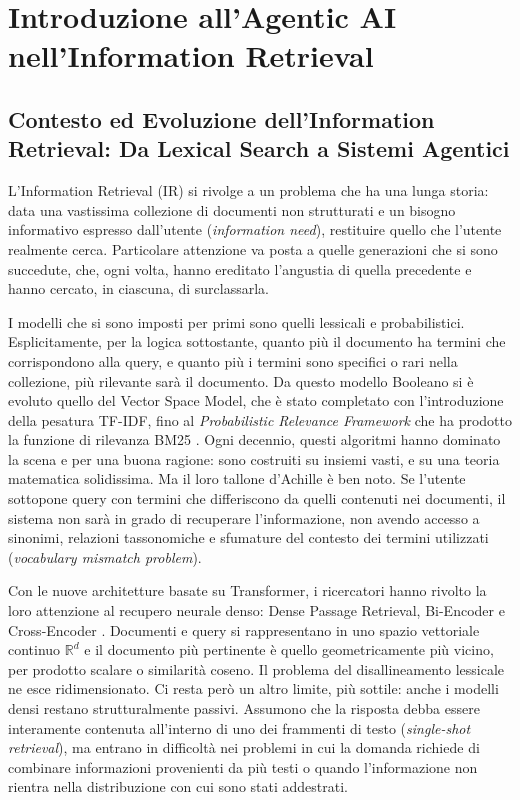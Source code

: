\chapter{Introduzione all'Agentic AI nell'Information Retrieval}
\label{chap:introduzione}

\section{Contesto ed Evoluzione dell'Information Retrieval: Da Lexical Search a Sistemi Agentici}
\label{sec:contesto_evoluzione}

L'Information Retrieval (IR) si rivolge a un problema che ha una lunga storia: data una vastissima collezione di documenti non strutturati e un bisogno informativo espresso dall'utente (\textit{information need}), restituire quello che l'utente realmente cerca. Particolare attenzione va posta a quelle generazioni che si sono succedute, che, ogni volta, hanno ereditato l'angustia di quella precedente e hanno cercato, in ciascuna, di surclassarla.

I modelli che si sono imposti per primi sono quelli lessicali e probabilistici. Esplicitamente, per la logica sottostante, quanto più il documento ha termini che corrispondono alla query, e quanto più i termini sono specifici o rari nella collezione, più rilevante sarà il documento. Da questo modello Booleano si è evoluto quello del Vector Space Model, che è stato completato con l'introduzione della pesatura TF-IDF, fino al \textit{Probabilistic Relevance Framework} che ha prodotto la funzione di rilevanza BM25 \cite{robertson2009probabilistic}. Ogni decennio, questi algoritmi hanno dominato la scena e per una buona ragione: sono costruiti su insiemi vasti, e su una teoria matematica solidissima. Ma il loro tallone d'Achille è ben noto. Se l'utente sottopone query con termini che differiscono da quelli contenuti nei documenti, il sistema non sarà in grado di recuperare l'informazione, non avendo accesso a sinonimi, relazioni tassonomiche e sfumature del contesto dei termini utilizzati (\textit{vocabulary mismatch problem}).

Con le nuove architetture basate su Transformer, i ricercatori hanno rivolto la loro attenzione al recupero neurale denso: Dense Passage Retrieval, Bi-Encoder e Cross-Encoder \cite{karpukhin2020dense}. Documenti e query si rappresentano in uno spazio vettoriale continuo $\mathbb{R}^d$ e il documento più pertinente è quello geometricamente più vicino, per prodotto scalare o similarità coseno. Il problema del disallineamento lessicale ne esce ridimensionato. Ci resta però un altro limite, più sottile: anche i modelli densi restano strutturalmente passivi. Assumono che la risposta debba essere interamente contenuta all'interno di uno dei frammenti di testo (\textit{single-shot retrieval}), ma entrano in difficoltà nei problemi in cui la domanda richiede di combinare informazioni provenienti da più testi o quando l'informazione non rientra nella distribuzione con cui sono stati addestrati.


